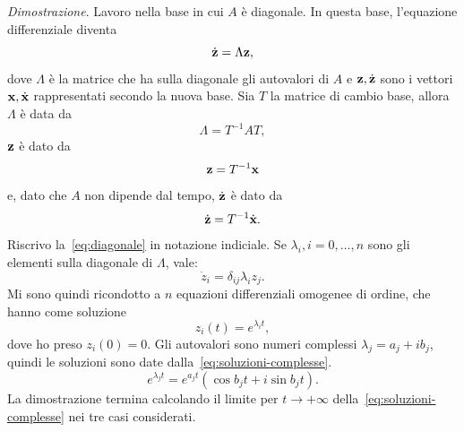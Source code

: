\emph{Dimostrazione}.
Lavoro nella base in cui $A$ è diagonale.
In questa base, l'equazione differenziale diventa
\begin{equation}
    \dot{\mathbf{z}} = \Lambda \mathbf{z},
    \label{eq:diagonale}
\end{equation}
dove $\Lambda$ è la matrice che ha sulla diagonale
gli autovalori di $A$ e $\mathbf{z}, \dot{\mathbf{z}}$ sono i vettori $\mathbf{x}, \dot{\mathbf{x}}$ rappresentati secondo la nuova base.
Sia $T$ la matrice di cambio base, allora $\Lambda$ è data da
\begin{equation*}
    \Lambda = T^{-1} A T,
\end{equation*}
$\mathbf{z}$ è dato da
\begin{equation*}
    \mathbf{z} = T^{-1} \mathbf{x}
\end{equation*}
e, dato che $A$ non dipende dal tempo, $\dot{\mathbf{z}}$ è dato da
\begin{equation*}
    \dot{\mathbf{z}} = T^{-1} \dot{\mathbf{x}}.
\end{equation*}
Riscrivo la~\eqref{eq:diagonale} in notazione indiciale.
Se $\lambda_i, i = 0, \ldots, n$ sono gli elementi sulla diagonale di $\Lambda$, vale:
\begin{equation*}
    \dot z_i = \delta_{ij} \lambda_i z_j.
\end{equation*}
Mi sono quindi ricondotto a $n$ equazioni differenziali omogenee di  ordine, che
hanno come soluzione
\begin{equation*}
    z_i(t) = e^{\lambda_i t},
\end{equation*}
dove ho preso $z_i(0) = 0$.
Gli autovalori sono numeri complessi $\lambda_j = a_j + i b_j$, quindi le soluzioni
sono date dalla~\eqref{eq:soluzioni-complesse}.
\begin{equation}
    e^{\lambda_j t} = e^{a_j t}\left(\cos{b_j t} + i\sin{b_j t} \right).
\label{eq:soluzioni-complesse}
\end{equation}
La dimostrazione termina calcolando il limite per $t \to +\infty$
della~\eqref{eq:soluzioni-complesse} nei tre casi considerati.
\hfill \qedsymbol \paragraph{}

